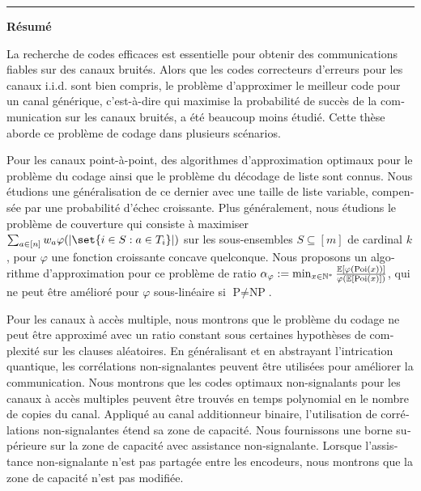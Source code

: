 \clearpage 

\flushright
\bigskip
\hrule \bigskip \bigskip
{\Huge \textbf{\textsf{Résumé}}}
\flushleftright
{}
\vspace{1.5cm}

\begin{otherlanguage}{french}
  La recherche de codes efficaces est essentielle pour obtenir des communications fiables sur des canaux bruités. Alors que les codes correcteurs d'erreurs pour les canaux i.i.d. sont bien compris, le problème d'approximer le meilleur code pour un canal générique, c'est-à-dire qui maximise la probabilité de succès de la communication sur les canaux bruités, a été beaucoup moins étudié. Cette thèse aborde ce problème de codage dans plusieurs scénarios.
  
  Pour les canaux point-à-point, des algorithmes d'approximation optimaux pour le problème du codage ainsi que le problème du décodage de liste sont connus. Nous étudions une généralisation de ce dernier avec une taille de liste variable, compensée par une probabilité d'échec croissante. Plus généralement, nous étudions le problème de couverture qui consiste à maximiser $\sum_{a \in [n]} w_a \varphi(\abs{\set{i \in S : a \in T_i}})$ sur les sous-ensembles $S \subseteq [m]$ de cardinal $k$, pour $\varphi$ une fonction croissante concave quelconque. Nous proposons un algorithme d'approximation pour ce problème de ratio $\alpha_{\varphi} := \min_{x \in \mathbb{N}^*} \frac{\mathbb{E}[\varphi(\operatorname{\text{Poi}}(x))]}{\varphi(\mathbb{E}[\operatorname{\text{Poi}}(x)])}$, qui ne peut être amélioré pour $\varphi$ sous-linéaire si $\textrm{P}\not=\textrm{NP}$.
  
  Pour les canaux à accès multiple, nous montrons que le problème du codage ne peut être approximé avec un ratio constant sous certaines hypothèses de complexité sur les clauses aléatoires. En généralisant et en abstrayant l'intrication quantique, les corrélations non-signalantes peuvent être utilisées pour améliorer la communication. Nous montrons que les codes optimaux non-signalants pour les canaux à accès multiples peuvent être trouvés en temps polynomial en le nombre de copies du canal. Appliqué au canal additionneur binaire, l'utilisation de corrélations non-signalantes étend sa zone de capacité. Nous fournissons une borne supérieure sur la zone de capacité avec assistance non-signalante. Lorsque l'assistance non-signalante n'est pas partagée entre les encodeurs, nous montrons que la zone de capacité n'est pas modifiée.
  

\end{otherlanguage}
